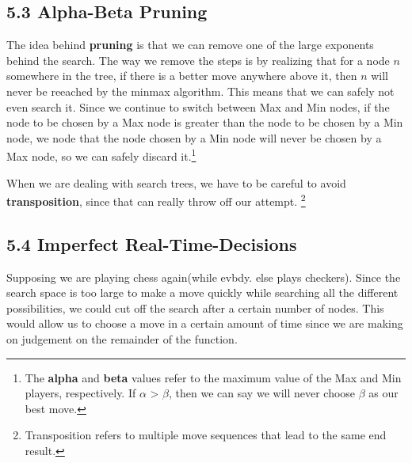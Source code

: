 \documentclass{tufte-handout}
\begin{document}
\subsection{5.3 Alpha-Beta Pruning}
	The idea behind \textbf{pruning} is that we can remove one of the large exponents 
	behind the search. The way we remove the steps is by realizing that for a node 
	$n$ somewhere in the tree, if there is a better move anywhere above it, then $n$
	will never be reeached by the minmax algorithm. This means that we can safely
	not even search it. Since we continue to switch between Max and Min nodes, if the 
	node to be chosen by a Max node is greater than the node to be chosen by a Min node,
	we node that the node chosen by a Min node will never be chosen by a Max node,
	so we can safely discard it.\footnote{The \textbf{alpha} and \textbf{beta} values refer 
	to the maximum value of the Max and Min players, respectively. If $\alpha$ > $\beta$,
	then we can say we will never choose $\beta$ as our best move.} 

	When we are dealing with search trees, we have to be careful to avoid 
	\textbf{transposition}, since that can really throw off our attempt.
	\footnote{Transposition refers to multiple move sequences that lead to the same end
	result.}
\subsection{5.4 Imperfect Real-Time-Decisions}
	Supposing we are playing chess again(while evbdy. else plays checkers). Since the search
	space is too large to make a move quickly while searching all the different possibilities,
	we could cut off the search after a certain number of nodes. This would allow us to 
	choose a move in a certain amount of time since we are making on judgement on 
	the remainder of the   function.	

	
\end{document}
